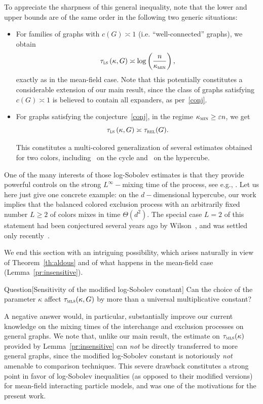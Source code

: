 \documentclass[AHL,Unicode,longabstracts,published]{cedram}
\newcommand{\trel}{\tau_{\textsc{rel}}}
\newcommand{\tmls}{\tau_{\textsc{mls}}}
\newcommand{\tls}{\tau_{\textsc{ls}}}
\newcommand{\am}{{\kappa_{\textsc{min}}}}
\begin{document}
To appreciate the sharpness of this general inequality, note that the lower and upper bounds are of the same order in the following two generic situations:
\begin{itemize}
\item For families of graphs with $c(G)\asymp 1$ (i.e. ``well-connected'' graphs), we obtain
\[
\tls\left(\kappa, G\right) \asymp \log\left(\frac{n}{\am}\right),
\]
exactly as in the mean-field case. Note that this potentially constitutes a considerable extension of our main result, since the class of graphs satisfying $c(G)\asymp 1$ is believed to contain all expanders, as per~\eqref{conj}.
\item For graphs satisfying the conjecture~\eqref{conj}, in the regime $\am\ge \varepsilon n$, we get
\[
\tls\left(\kappa, G\right) \asymp \trel(G).
\]

This constitutes a multi-colored generalization of several estimates obtained for two colors, including~\cite[Theorem~4]{MR1675008} on the cycle and~\cite[Corollary~2.6]{2019arXiv190502146H} on the hypercube.
\end{itemize}


\begin{rema}
One of the many interests of those log-Sobolev estimates is that they provide powerful controls on the strong $L^\infty-$mixing time of the process, see e.g., \cite{MR2341319}. Let us here just give one concrete example: on the $d-$dimensional hypercube, our work implies that the balanced colored exclusion process with an arbitrarily fixed number $L\ge 2$ of colors mixes in time $\Theta(d^2)$. The special case $L=2$ of this statement had been conjectured several years ago by Wilson~\cite{MR2023023}, and was settled only recently~\cite{hermon2018exclusion}.
\end{rema}

We end this section with an intriguing possibility, which arises naturally in view of Theorem~\ref{th:aldous} and of what happens in the mean-field case (Lemma~\ref{pr:insensitive}).


\begin{enonce}{Question}[Sensitivity of the modified log-Sobolev constant]
Can the choice of the parameter $\kappa$ affect $\tmls(\kappa,G)$ by more than a universal multiplicative constant?
\end{enonce}

A negative answer would, in particular, substantially improve our current knowledge on the mixing times of the interchange and exclusion processes on general graphs. We note that, unlike our main result, the estimate on $\tmls(\kappa)$ provided by Lemma~\ref{pr:insensitive} can \emph{not} be directly transferred to more general graphs, since the modified log-Sobolev constant is notoriously \emph{not} amenable to comparison techniques. This severe drawback constitutes a strong point in favor of log-Sobolev inequalities (as opposed to their modified versions) for mean-field interacting particle models, and was one of the motivations for the present work.
\end{document}
